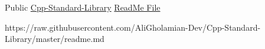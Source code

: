 \documentclass[9pt]{developercv} %
\begin{document}
\begin{entrylist}	 \entry
		   {Public}
		   {\href{https://github.com/AliGholamian-Dev/Cpp-Standard-Library}{Cpp-Standard-Library}}
		   {\href{https://github.com/AliGholamian-Dev/Cpp-Standard-Library/blob/master/readme.md}
		   {ReadMe File}}
		 {}
\end{entrylist}
\newenvironment{markdown}%
		{\VerbatimEnvironment\begin{VerbatimOut}{https://raw.githubusercontent.com/AliGholamian-Dev/Cpp-Standard-Library/master/readme.md}}%
		{\end{VerbatimOut}%
			\immediate{}%
			}
				\begin{markdown}
			
				\end{markdown}


\begin{minipage}[t]{0.3\textwidth}
	\vspace{-\baselineskip} %
	
	
	
\end{minipage}
\hfill
\begin{minipage}[t]{0.3\textwidth}
	\vspace{-\baselineskip} %
	
	
	
\end{minipage}

\end{document}
